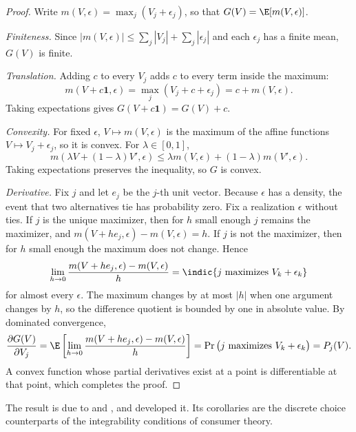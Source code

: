 \begin{proof}
Write $m(V, \epsilon) = \max_j (V_j + \epsilon_j)$, so that $G(V) = \E[m(V, \epsilon)]$.

\emph{Finiteness.} Since $|m(V, \epsilon)| \le \sum_j |V_j| + \sum_j |\epsilon_j|$ and each $\epsilon_j$ has a finite
mean, $G(V)$ is finite.

\emph{Translation.} Adding $c$ to every $V_j$ adds $c$ to every term inside the maximum:
\begin{equation*}
m(V + c\mathbf{1}, \epsilon) = \max_j (V_j + c + \epsilon_j) = c + m(V, \epsilon).
\end{equation*}
Taking expectations gives $G(V + c\mathbf{1}) = G(V) + c$.

\emph{Convexity.} For fixed $\epsilon$, $V \mapsto m(V, \epsilon)$ is the maximum of the affine functions
$V \mapsto V_j + \epsilon_j$, so it is convex. For $\lambda \in [0,1]$,
\begin{equation*}
m(\lambda V + (1-\lambda)V', \epsilon) \le \lambda m(V, \epsilon) + (1-\lambda) m(V', \epsilon).
\end{equation*}
Taking expectations preserves the inequality, so $G$ is convex.

\emph{Derivative.} Fix $j$ and let $e_j$ be the $j$-th unit vector. Because $\epsilon$ has a density, the
event that two alternatives tie has probability zero. Fix a realization $\epsilon$ without ties. If $j$ is the
unique maximizer, then for $h$ small enough $j$ remains the maximizer, and
$m(V + he_j, \epsilon) - m(V, \epsilon) = h$. If $j$ is not the maximizer, then for $h$ small enough the
maximum does not change. Hence
\begin{equation*}
\lim_{h \to 0}\frac{m(V + he_j, \epsilon) - m(V, \epsilon)}{h} = \indic\{j \text{ maximizes } V_k + \epsilon_k\}
\end{equation*}
for almost every $\epsilon$. The maximum changes by at most $|h|$ when one argument changes by $h$, so the
difference quotient is bounded by one in absolute value. By dominated convergence,
\begin{equation*}
\frac{\partial G(V)}{\partial V_j}
= \E\left[\lim_{h\to 0}\frac{m(V + he_j, \epsilon) - m(V, \epsilon)}{h}\right]
= \Pr\big(j \text{ maximizes } V_k + \epsilon_k\big) = P_j(V).
\end{equation*}
A convex function whose partial derivatives exist at a point is differentiable at that point, which completes
the proof.
\end{proof}

The result is due to \citet{Williams1977} and \citet{DalyZachary1978}, and \citet{McFadden1981} developed it.
Its corollaries are the discrete choice counterparts of the integrability conditions of consumer theory.

